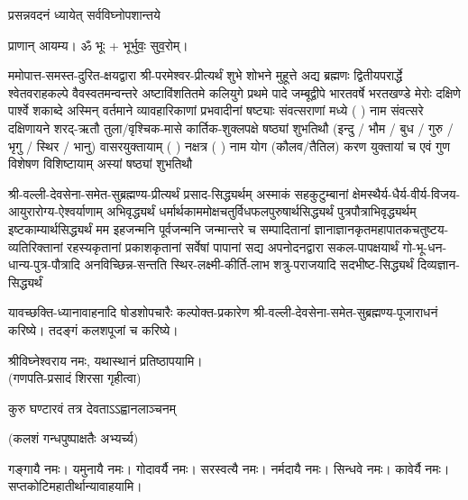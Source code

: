 
\setlength{\parindent}{0pt}




{प्रसन्नवदनं ध्यायेत् सर्वविघ्नोपशान्तये}

प्राणान् आयम्य। ॐ भूः + भूर्भुवः॒ सुव॒रोम्।



ममोपात्त-समस्त-दुरित-क्षयद्वारा श्री-परमेश्वर-प्रीत्यर्थं शुभे शोभने मुहूत्ते अद्य ब्रह्मणः
द्वितीयपरार्द्धे श्वेतवराहकल्पे वैवस्वतमन्वन्तरे अष्टाविंशतितमे कलियुगे प्रथमे पादे
जम्बूद्वीपे भारतवर्षे भरतखण्डे मेरोः दक्षिणे पार्श्वे शकाब्दे अस्मिन् वर्तमाने व्यावहारिकाणां प्रभवादीनां षष्ट्याः संवत्सराणां मध्ये (  ) नाम संवत्सरे दक्षिणायने 
शरद्-ऋतौ  तुला/वृश्चिक-मासे कार्तिक-शुक्लपक्षे षष्ठ्यां शुभतिथौ
(इन्दु / भौम / बुध / गुरु / भृगु / स्थिर / भानु) वासरयुक्तायाम्
(  ) नक्षत्र (  ) नाम  योग  (कौलव/तैतिल) करण युक्तायां च एवं गुण विशेषण विशिष्टायाम् अस्यां षष्ठ्यां शुभतिथौ 

श्री-वल्ली-देवसेना-समेत-सुब्रह्मण्य-प्रीत्यर्थं प्रसाद-सिद्ध्यर्थम्
अस्माकं सहकुटुम्बानां क्षेमस्थैर्य-धैर्य-वीर्य-विजय-आयुरारोग्य-ऐश्वर्याणाम् अभिवृद्ध्यर्थं
धर्मार्थ\-काम\-मोक्ष\-चतुर्विध\-फल\-पुरुषार्थ\-सिद्ध्यर्थं पुत्र\-पौत्रा\-भि\-वृद्ध्यर्थम् इष्ट\-काम्यार्थ\-सिद्ध्यर्थं
मम इहजन्मनि पूर्वजन्मनि जन्मान्तरे च सम्पादितानां ज्ञानाज्ञानकृतमहा\-पातकचतुष्टय-व्यतिरिक्तानां रहस्यकृतानां प्रकाशकृतानां सर्वेषां पापानां सद्य अपनोदनद्वारा 
सकल-पाप\-क्षयार्थं गो-भू-धन-धान्य-पुत्र-पौत्रादि अनविच्छिन्न-सन्तति स्थिर-लक्ष्मी-कीर्ति-लाभ शत्रु-पराजयादि सदभीष्ट-सिद्ध्यर्थं दिव्यज्ञान-सिद्ध्यर्थं

यावच्छक्ति-ध्यानावाहनादि षोडशोपचारैः कल्पोक्त-प्रकारेण श्री-वल्ली-देवसेना-समेत-सुब्रह्मण्य-पूजाराधनं करिष्ये। तदङ्गं कलश\-पूजां च करिष्ये।


श्रीविघ्नेश्वराय नमः, यथास्थानं प्रतिष्ठापयामि।\\
(गणपति-प्रसादं शिरसा गृहीत्वा)


{कुरु घण्टारवं तत्र देवताऽऽह्वानलाञ्चनम्}


(कलशं गन्धपुष्पाक्षतैः अभ्यर्च्य)

गङ्गायै नमः। यमुनायै नमः। गोदावर्यै नमः। सरस्वत्यै नमः। नर्मदायै नमः। सिन्धवे नमः। कावेर्यै नमः।\\
सप्तकोटिमहातीर्थान्यावाहयामि। \\

